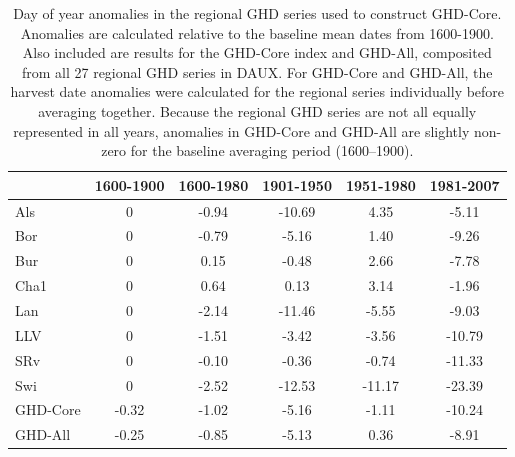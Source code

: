 \documentclass[12pt]{article}
\begin{document}
\begin{table}
\small
\caption{\small Day of year anomalies in the regional GHD series used to construct GHD-Core. Anomalies are calculated relative to the baseline mean dates from 1600-1900. Also included are results for the GHD-Core index and GHD-All, composited from all 27 regional GHD series in DAUX. For GHD-Core and GHD-All, the harvest date anomalies were calculated for the regional series individually before averaging together. Because the regional GHD series are not all equally represented in all years, anomalies in GHD-Core and GHD-All are slightly non-zero for the baseline averaging period (1600--1900).}
\centering
\begin{tabular}{l c c c c c}
\hline
& \bf 1600-1900 & \bf 1600-1980 & \bf 1901-1950 & \bf 1951-1980 & \bf 1981-2007\\
\hline
Als	& 0	& -0.94 & -10.69 & 4.35 & -5.11\\
Bor	& 0 & -0.79 & -5.16 & 1.40 & -9.26\\
Bur	& 0	& 0.15	& -0.48	& 2.66	& -7.78\\
Cha1	& 0	& 0.64	& 0.13	& 3.14	& -1.96\\
Lan & 0 & -2.14 & -11.46 & -5.55 & -9.03\\
LLV	& 0	& -1.51	& -3.42	& -3.56	& -10.79\\
SRv & 0	& -0.10	& -0.36	& -0.74	& -11.33\\
Swi	& 0	& -2.52	& -12.53	& -11.17	& -23.39\\
\hline
GHD-Core & -0.32 & -1.02	& -5.16 & -1.11 & -10.24\\
GHD-All	& -0.25 & -0.85 & -5.13 & 0.36 & -8.91\\
\hline
\end{tabular}
\end{table}
\end{document}
